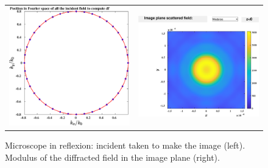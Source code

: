 \begin{figure}[H]
\begin{center}
\begin{tabular}{cc}
 \includegraphics*[width=7.0cm,draft=false]{test4angleincdf.eps}
&  \includegraphics*[width=7.0cm,draft=false]{test4imagewf.eps}
\end{tabular}

\end{center}
\caption{Microscope in reflexion: incident taken to make the image
  (left). Modulus of the diffracted field in the image plane (right).}
\end{figure}

